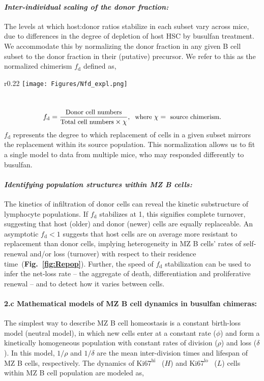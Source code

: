 \documentclass[11pt]{article}
\newcommand{\khi}{\ensuremath{\text{Ki67}^\text{hi}}~}
\newcommand{\klo}{\ensuremath{\text{Ki67}^\text{lo}}~}
\newcommand{\para}[1]{\vspace*{-4.5mm}\paragraph{#1}}
\begin{document}
\para{\textit{Inter-individual scaling of the donor fraction:}}
The levels at which host:donor ratios stabilize in each subset vary across mice, due to differences in the degree of depletion of host HSC by busulfan treatment. We accommodate this by normalizing the donor fraction in any given B cell subset to the donor fraction in their (putative) precursor. We refer to this as the normalized chimerism $f_\text{d}$ defined as,

\begin{wrapfigure}{r}{0.22\textwidth}
\centering
\vspace*{-9mm}
\texttt{[image: Figures/Nfd\_expl.png]}
\vspace*{-3mm}
\caption{{The $f_\text{d}$ kinetic  reflects net-loss rates, and heterogeneity in cell dynamics.}}%
\label{fig:Repop}
\end{wrapfigure}
~
\begin{equation}\small
f_\text{d} = \frac{\text{Donor cell numbers}}{\text{Total cell numbers} \times \chi}, \;\; \text{where } \chi  =\text{ source chimerism.}
\label{eq:Nfd}
\end{equation}
$f_\text{d}$ represents the degree to which replacement of cells in a given subset mirrors the replacement within its source population.
This normalization allows us to fit a single model to data from multiple mice, who may responded differently to busulfan. %

\para{\textit{Identifying population structures within MZ B cells:}}
The kinetics of infiltration of donor cells can reveal the kinetic substructure of lymphocyte populations.
If $f_\text{d}$ stabilizes at 1, this signifies complete turnover, suggesting that host (older) and donor (newer) cells are equally replaceable.
An asymptotic $f_\text{d}<1$ suggests that host cells are on average more resistant to replacement than donor cells,  implying heterogeneity in MZ B cells' rates of self-renewal and/or loss (turnover) with respect to their residence time~(\textbf{Fig.~\ref{fig:Repop}}).
Further, the speed of $f_\text{d}$ stabilization can be used to infer the net-loss rate -- the aggregate of death, differentiation and proliferative renewal -- and to detect how it varies between cells.


\para{{2.c Mathematical models of  MZ B cell dynamics in busulfan chimeras:}} \label{sec:buchi_models}
The simplest way to describe MZ B cell homeostasis is a constant birth-loss model (neutral model), in which new cells enter at a constant rate ($\phi$) and form a kinetically homogeneous population with constant rates of division ($\rho$) and loss ($\delta$).
In this model, $1/\rho$ and $1/\delta$ are the mean inter-division times and lifespan of MZ B cells, respectively.
The dynamics of {\khi} ($H$) and {\klo} ($L$) cells within MZ B cell population are modeled as, 
\end{document}
